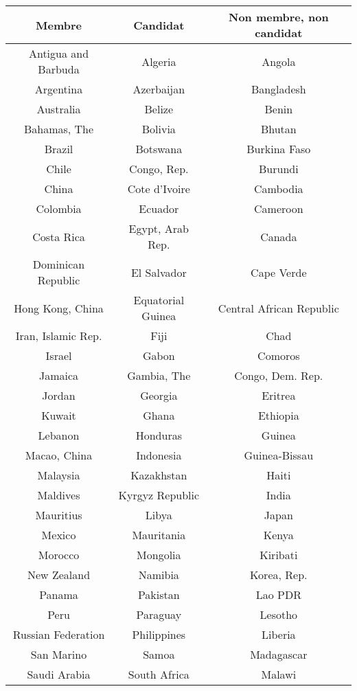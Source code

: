 \begin{center}
\begin{longtable}{|c|c|c|}

\hline
{\bf Membre}&{\bf Candidat}&{\bf Non membre, non candidat}\\
\endhead
\hline
Antigua and Barbuda&Algeria&Angola\\
\hline
Argentina&Azerbaijan&Bangladesh\\
\hline
Australia&Belize&Benin\\
\hline
Bahamas, The&Bolivia&Bhutan\\
\hline
Brazil&Botswana&Burkina Faso\\
\hline
Chile&Congo, Rep.&Burundi\\
\hline
China&Cote d'Ivoire&Cambodia\\
\hline
Colombia&Ecuador&Cameroon\\
\hline
Costa Rica&Egypt, Arab Rep.&Canada\\
\hline
Dominican Republic&El Salvador&Cape Verde\\
\hline
Hong Kong, China&Equatorial Guinea&Central African Republic\\
\hline
Iran, Islamic Rep.&Fiji&Chad\\
\hline
Israel&Gabon&Comoros\\
\hline
Jamaica&Gambia, The&Congo, Dem. Rep.\\
\hline
Jordan&Georgia&Eritrea\\
\hline
Kuwait&Ghana&Ethiopia\\
\hline
Lebanon&Honduras&Guinea\\
\hline
Macao, China&Indonesia&Guinea-Bissau\\
\hline
Malaysia&Kazakhstan&Haiti\\
\hline
Maldives&Kyrgyz Republic&India\\
\hline
Mauritius&Libya&Japan\\
\hline
Mexico&Mauritania&Kenya\\
\hline
Morocco&Mongolia&Kiribati\\
\hline
New Zealand&Namibia&Korea, Rep.\\
\hline
Panama&Pakistan&Lao PDR\\
\hline
Peru&Paraguay&Lesotho\\
\hline
Russian Federation&Philippines&Liberia\\
\hline
San Marino&Samoa&Madagascar\\
\hline
Saudi Arabia&South Africa&Malawi\\
\hline

\end{longtable}
\end{center}
